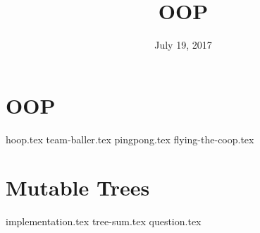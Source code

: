 \documentclass{exam}
\title{OOP}
\date{July 19, 2017}
\begin{document}
\maketitle

\section{OOP}
\begin{questions}
{hoop.tex}
{team-baller.tex}
{pingpong.tex}
{flying-the-coop.tex}
\clearpage
\section{Mutable Trees}
{implementation.tex}
{tree-sum.tex}
{question.tex}
\end{questions}
\end{document}

